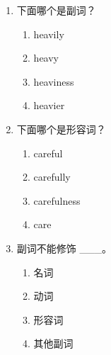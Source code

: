 \documentclass[11pt,a4paper]{ctexart}
\begin{document}
\begin{enumerate}[leftmargin=*,itemsep=4pt]
\begin{enumerate}[label=\Alph*.,leftmargin=2em,itemsep=1pt,topsep=2pt]
\item 主语
\end{enumerate}
\item 下面哪个是副词？
\begin{enumerate}[label=\Alph*.,leftmargin=2em,itemsep=1pt,topsep=2pt]
\item heavily
\item heavy
\item heaviness
\item heavier
\end{enumerate}
\item 下面哪个是形容词？
\begin{enumerate}[label=\Alph*.,leftmargin=2em,itemsep=1pt,topsep=2pt]
\item careful
\item carefully
\item carefulness
\item care
\end{enumerate}
\item 副词不能修饰 \_\_\_。
\begin{enumerate}[label=\Alph*.,leftmargin=2em,itemsep=1pt,topsep=2pt]
\item 名词
\item 动词
\item 形容词
\item 其他副词
\end{enumerate}
\end{enumerate}
\end{document}
